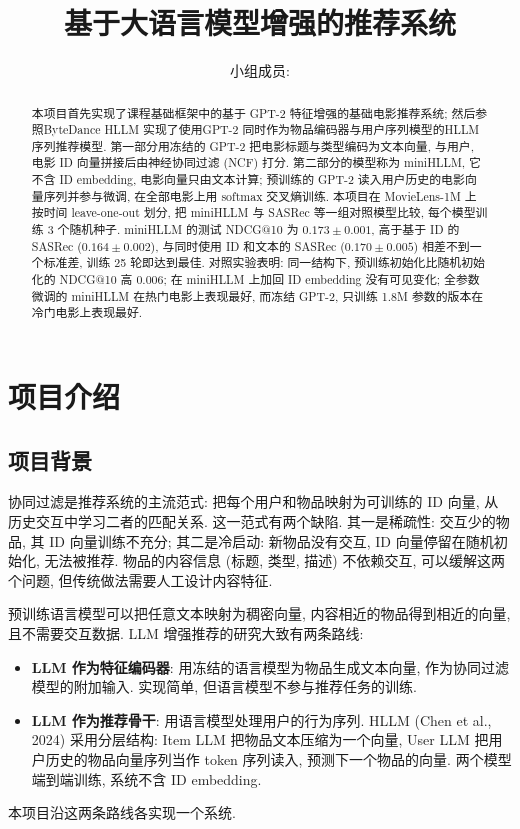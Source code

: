 \documentclass{article}
\title{基于大语言模型增强的推荐系统}
\author{小组成员:}
\date{}
\begin{document}
\maketitle

\begin{abstract}
本项目首先实现了课程基础框架中的基于 GPT-2 特征增强的基础电影推荐系统; 然后参照ByteDance HLLM 实现了使用GPT-2 同时作为物品编码器与用户序列模型的HLLM 序列推荐模型. 第一部分用冻结的 GPT-2 把电影标题与类型编码为文本向量, 与用户, 电影 ID 向量拼接后由神经协同过滤 (NCF) 打分. 第二部分的模型称为 miniHLLM, 它不含 ID embedding, 电影向量只由文本计算; 预训练的 GPT-2 读入用户历史的电影向量序列并参与微调, 在全部电影上用 softmax 交叉熵训练. 本项目在 MovieLens-1M 上按时间 leave-one-out 划分, 把 miniHLLM 与 SASRec 等一组对照模型比较, 每个模型训练 3 个随机种子. miniHLLM 的测试 NDCG@10 为 $0.173 \pm 0.001$, 高于基于 ID 的 SASRec ($0.164 \pm 0.002$), 与同时使用 ID 和文本的 SASRec ($0.170 \pm 0.005$) 相差不到一个标准差, 训练 25 轮即达到最佳. 对照实验表明: 同一结构下, 预训练初始化比随机初始化的 NDCG@10 高 0.006; 在 miniHLLM 上加回 ID embedding 没有可见变化; 全参数微调的 miniHLLM 在热门电影上表现最好, 而冻结 GPT-2, 只训练 1.8M 参数的版本在冷门电影上表现最好.
\end{abstract}

\section{项目介绍}

\subsection{项目背景}

协同过滤是推荐系统的主流范式: 把每个用户和物品映射为可训练的 ID 向量, 从历史交互中学习二者的匹配关系. 这一范式有两个缺陷. 其一是稀疏性: 交互少的物品, 其 ID 向量训练不充分; 其二是冷启动: 新物品没有交互, ID 向量停留在随机初始化, 无法被推荐. 物品的内容信息 (标题, 类型, 描述) 不依赖交互, 可以缓解这两个问题, 但传统做法需要人工设计内容特征.

预训练语言模型可以把任意文本映射为稠密向量, 内容相近的物品得到相近的向量, 且不需要交互数据. LLM 增强推荐的研究大致有两条路线:
\begin{itemize}
  \item \textbf{LLM 作为特征编码器}: 用冻结的语言模型为物品生成文本向量, 作为协同过滤模型的附加输入. 实现简单, 但语言模型不参与推荐任务的训练.
  \item \textbf{LLM 作为推荐骨干}: 用语言模型处理用户的行为序列. HLLM (Chen et al., 2024) 采用分层结构: Item LLM 把物品文本压缩为一个向量, User LLM 把用户历史的物品向量序列当作 token 序列读入, 预测下一个物品的向量. 两个模型端到端训练, 系统不含 ID embedding.
\end{itemize}
本项目沿这两条路线各实现一个系统.
\end{document}
